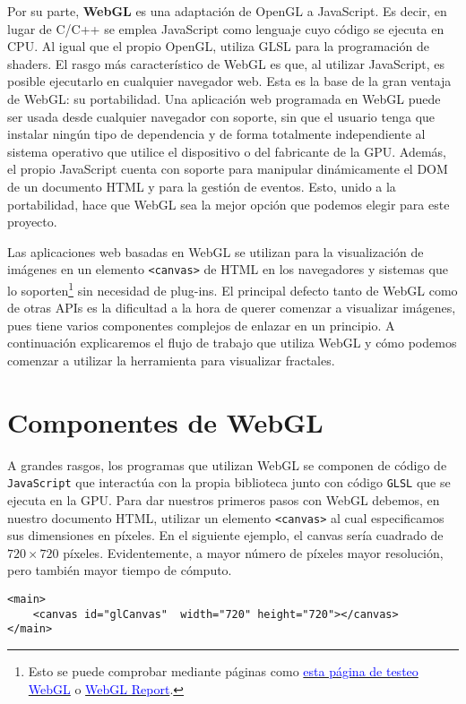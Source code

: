 Por su parte, \textbf{WebGL} es una adaptación de OpenGL a JavaScript. Es decir, en lugar de C/C++ se emplea JavaScript como lenguaje cuyo código se ejecuta en CPU. Al igual que el propio OpenGL, utiliza GLSL para la programación de shaders. El rasgo más característico de WebGL es que, al utilizar JavaScript, es posible ejecutarlo en cualquier navegador web. Esta es la base de la gran ventaja de WebGL: su portabilidad. Una aplicación web programada en WebGL puede ser usada desde cualquier navegador con soporte, sin que el usuario tenga que instalar ningún tipo de dependencia y de forma totalmente independiente al sistema operativo que utilice el dispositivo o del fabricante de la GPU. Además, el propio JavaScript cuenta con soporte para manipular dinámicamente el DOM de un documento HTML y para la gestión de eventos. Esto, unido a la portabilidad, hace que WebGL sea la mejor opción que podemos elegir para este proyecto.

Las aplicaciones web basadas en WebGL se utilizan para la visualización de imágenes en un elemento \verb|<canvas>| de HTML en los navegadores y sistemas que lo soporten\footnote{Esto se puede comprobar mediante páginas como \href{https://get.webgl.org/}{\textcolor{blue}{esta página de testeo WebGL}} o \href{http://webglreport.com/}{\textcolor{blue}{WebGL Report}}.} sin necesidad de plug-ins. El principal defecto tanto de WebGL como de otras APIs es la dificultad a la hora de querer comenzar a visualizar imágenes, pues tiene varios componentes complejos de enlazar en un principio. A continuación explicaremos el flujo de trabajo que utiliza WebGL y cómo podemos comenzar a utilizar la herramienta para visualizar fractales.

\section{Componentes de WebGL}
\label{section:componentes-wgl}

A grandes rasgos, los programas que utilizan WebGL se componen de código de \verb|JavaScript| que interactúa con la propia biblioteca junto con código \verb|GLSL| que se ejecuta en la GPU. Para dar nuestros primeros pasos con WebGL debemos, en nuestro documento HTML, utilizar un elemento \verb|<canvas>| al cual especificamos sus dimensiones en píxeles. En el siguiente ejemplo, el canvas sería cuadrado de $720\times 720$ píxeles. Evidentemente, a mayor número de píxeles mayor resolución, pero también mayor tiempo de cómputo.

\begin{lstlisting}
<main>
    <canvas id="glCanvas"  width="720" height="720"></canvas>
</main>
\end{lstlisting}

